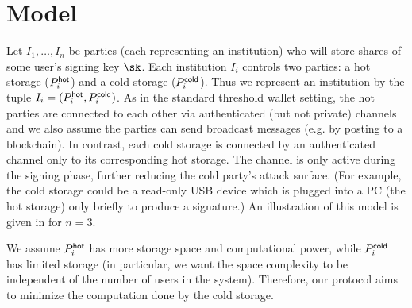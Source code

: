 \section{Model}\label{sec:model}



Let $I_1, \ldots, I_n$ be parties (each representing an institution) who will store shares of some user's signing key $\sk$. Each institution $I_i$ controls two parties: a hot storage ($P_i^{\mathsf{hot}}$) and a cold storage ($P_i^{\mathsf{cold}}$). Thus we represent an institution by the tuple $I_i = (P_i^{\mathsf{hot}}, P_i^{\mathsf{cold}})$. 
As in the standard threshold wallet setting, the hot parties are connected to each other via authenticated (but not private) channels and we also assume the parties can send broadcast messages (e.g. by posting to a blockchain).  %
In contrast, each cold storage is connected by an authenticated channel only to its corresponding hot storage. The channel is only active during the signing phase, further reducing the cold party's attack surface. (For example, the cold storage could be a read-only USB device which is plugged into a PC (the hot storage) only briefly to produce a signature.) 
An illustration of this model is given in  for $n=3$.

We assume $P_i^{\mathsf{hot}}$ has more storage space and computational power, while $P_i^{\mathsf{cold}}$ has limited storage (in particular, we want the space complexity to be independent of the number of users in the system). 
Therefore, our protocol aims to minimize the computation done by the cold storage.